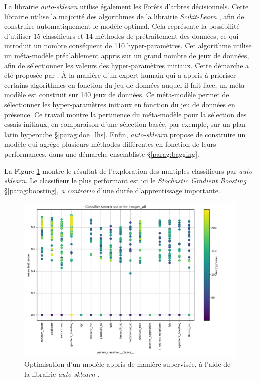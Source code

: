 La librairie \textit{auto-sklearn} \cite{feurer_efficient_2015} utilise également les Forêts d'arbres décisionnels.
Cette librairie utilise la majorité des algorithmes de la librairie \textit{Scikit-Learn} \cite{pedregosa_scikit-learn_2011}, afin de construire automatiquement le modèle optimal.
Cela représente la possibilité d'utiliser 15 classifieurs et 14 méthodes de prétraitement des données, ce qui introduit un nombre conséquent de 110 hyper-paramètres.
Cet algorithme utilise un méta-modèle préalablement appris sur un grand nombre de jeux de données, afin de sélectionner les valeurs des hyper-paramètres initiaux.
Cette démarche a été proposée par \citeauthor{feurer_initializing_2015} \cite{feurer_initializing_2015}.
À la manière d'un expert humain qui a appris à prioriser certains algorithmes en fonction du jeu de données auquel il fait face, un méta-modèle est construit sur 140 jeux de données.
Ce méta-modèle permet de sélectionner les hyper-paramètres initiaux en fonction du jeu de données en présence.
Ce travail montre la pertinence du méta-modèle pour la sélection des essais initiaux, en comparaison d'une sélection basée, par exemple, sur un plan latin hypercube §\ref{parag:doe_lhs}.
Enfin, \textit{auto-sklearn} propose de construire un modèle qui agrège plusieurs méthodes différentes en fonction de leurs performances, dans une démarche ensembliste §\ref{parag:bagging}.

La Figure \ref{fig:autosk_result} montre le résultat de l'exploration des multiples classifieurs par \textit{auto-sklearn}.
Le classifieur le plus performant est ici le \textit{Stochastic Gradient Boosting} §\ref{parag:boosting}, \textit{a contrario} d'une durée d'apprentissage importante.

\begin{figure}[hbtp]
	\centering
	\includegraphics[width=\textwidth,height=\textheight,keepaspectratio]{../Chap4/Figures/cv_results_images_all.png}
	\caption{Optimisation d'un modèle appris de manière supervisée, à l'aide de la librairie \textit{auto-sklearn} \cite{feurer_efficient_2015}.}
	\label{fig:autosk_result}
\end{figure}


